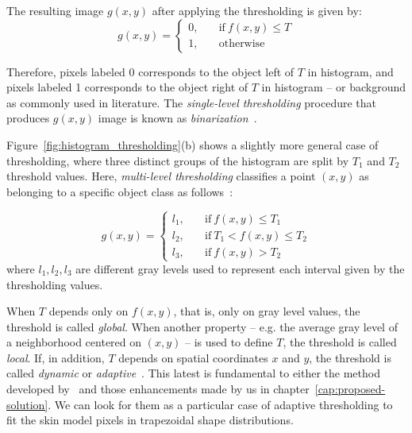 The resulting image $g(x, y)$ after applying the thresholding is given by:
\begin{equation}
g(x, y) =   \begin{cases}
                0, \quad &\text{if}\ f(x, y) \leq T\\[0.7em]
                1, \quad &\text{otherwise}
            \end{cases}
\end{equation}

Therefore, pixels labeled 0 corresponds to the object left of $T$ in histogram, and pixels labeled 1 corresponds to the object right of $T$ in histogram -- or background as commonly used in literature. The \emph{single-level thresholding} procedure that produces $g(x, y)$ image is known as \emph{binarization}~\citep{gonzalez:02}.

Figure~\ref{fig:histogram_thresholding}(b) shows a slightly more general case of thresholding, where three distinct groups of the histogram are split by $T_1$ and $T_2$ threshold values. Here, \emph{multi-level thresholding} classifies a point $(x, y)$ as belonging to a specific object class as follows~\citep{gonzalez:02}:

\begin{equation}
g(x, y) =   \begin{cases}
                l_1, \quad &\text{if}\ f(x, y) \leq T_1\\[0.7em]
                l_2, \quad &\text{if}\ T_1 < f(x, y) \leq T_2\\[0.7em]
                l_3, \quad &\text{if}\ f(x, y) > T_2
            \end{cases}
\end{equation}
where $l_1, l_2, l_3$ are different gray levels used to represent each interval given by the thresholding values.

When $T$ depends only on $f(x, y)$, that is, only on gray level values, the threshold is called \emph{global}. When another property -- e.g. the average gray level of a neighborhood centered on $(x, y)$ -- is used to define $T$, the threshold is called \emph{local}. If, in addition, $T$ depends on spatial coordinates $x$ and $y$, the threshold is called \emph{dynamic} or \emph{adaptive}~\citep{gonzalez:02}. This latest is fundamental to either the method developed by~\citet{brancati:17} and those enhancements made by us in chapter~\ref{cap:proposed-solution}. We can look for them as a particular case of adaptive thresholding to fit the skin model pixels in trapezoidal shape distributions.


